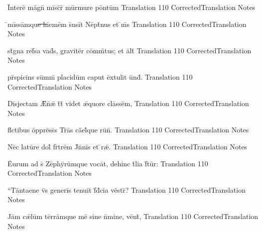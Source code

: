 \documentclass[]{book}
\begin{document}
\newpage
\latline
  {\=Int\-er\-e\={} m\=agn\={} m\=isc\={}r\={\macron {\i}} m\=urm\-ur\-e p\=ont\=um}
  { Translation }
  {110}
  { CorrectedTranslation }
  { Notes }



\latline
  {\={}m\=iss\=amqu\sout{e h}\={ie}m\=em s\={}ns\=it N\=ept\={}n\-us \-et \={\macron {\i}}m\={\macron {\i}}s}
  { Translation }
  {110}
  { CorrectedTranslation }
  { Notes }


\latline
  {st\={}gn\-a r\-ef\={}s\-a v\-ad\={\macron {\i}}s, gr\-av\-it\=er c\=omm\={}t\-us; \-et \=alt\={}}
  { Translation }
  {110}
  { CorrectedTranslation }
  { Notes }



\newpage

\latline
  {pr\={}sp\-ic\-i\={}ns s\=umm\={} pl\-ac\-id\=um c\-ap\-ut \=ext\-ul\-it \=und\={}.}
  { Translation }
  {110}
  { CorrectedTranslation }
  { Notes }


\latline
  {D\=isj\-ect\-am \={\AE}n\={}\={\ae} t\={}t\={} v\-id\-et \={\ae}qu\-or\-e cl\=ass\=em,}
  { Translation }
  {110}
  { CorrectedTranslation }
  { Notes }


\latline
  {fl\={}ct\-ib\-us \=oppr\=ess\={}s Tr\={}\=as c\={\=ae}l\={\macron {\i}}qu\-e r\-u\={\macron {\i}}n\={}.}
  { Translation }
  {110}
  { CorrectedTranslation }
  { Notes }



\newpage

\latline
  {N\=ec l\-at\-u\={}r\-e d\-ol\={\macron {\i}} fr\={}tr\=em J\={}n\={}n\=is \-et \={\macron {\i}}r\={\ae}.}
  { Translation }
  {110}
  { CorrectedTranslation }
  { Notes }


\latline
  {\={Eu}r\-um \-ad s\={} Z\=eph\=yr\=umqu\-e v\-oc\=at, d\-eh\-inc t\={}l\-i\-a f\={}t\=ur:}
  { Translation }
  {110}
  { CorrectedTranslation }
  { Notes }


\latline
  {``T\=ant\-aen\-e v\={}s g\-en\-er\=is t\-en\-u\=it f\={\macron {\i}}d\={}c\-i\-a v\=estr\={\macron {\i}}?}
  { Translation }
  {110}
  { CorrectedTranslation }
  { Notes }



\newpage

\latline
  {J\=am c\={\ae}l\=um t\=err\=amqu\-e m\-e\={} s\-in\-e n\={}m\-in\-e, v\=ent\={\macron {\i}},}
  { Translation }
  {110}
  { CorrectedTranslation }
  { Notes }
\end{document}
